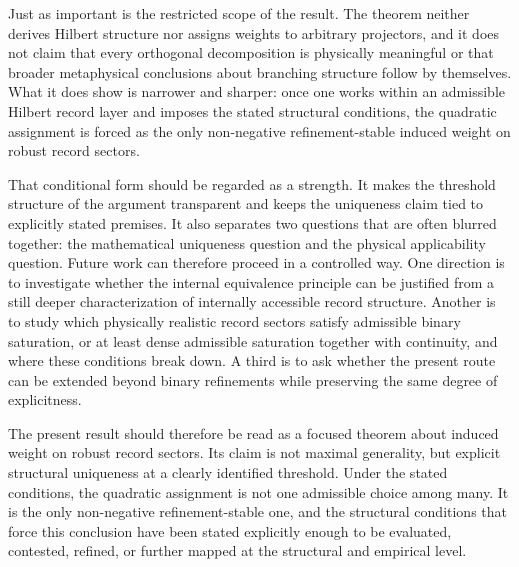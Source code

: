 \documentclass[11pt]{article}
\theoremstyle{remark}
\numberwithin{equation}{section}
\begin{document}
Just as important is the restricted scope of the result. The theorem neither derives Hilbert structure nor assigns weights to arbitrary projectors, and it does not claim that every orthogonal decomposition is physically meaningful or that broader metaphysical conclusions about branching structure follow by themselves. What it does show is narrower and sharper: once one works within an admissible Hilbert record layer and imposes the stated structural conditions, the quadratic assignment is forced as the only non-negative refinement-stable induced weight on robust record sectors.

That conditional form should be regarded as a strength. It makes the
threshold structure of the argument transparent and keeps the
uniqueness claim tied to explicitly stated premises. It also separates
two questions that are often blurred together: the mathematical
uniqueness question and the physical applicability question. Future
work can therefore proceed in a controlled way. One direction is to
investigate whether the internal equivalence principle can be justified
from a still deeper characterization of internally accessible record
structure. Another is to study which physically realistic record
sectors satisfy admissible binary saturation, or at least dense
admissible saturation together with continuity, and where these
conditions break down. A third is to ask whether the present route can
be extended beyond binary refinements while preserving the same degree
of explicitness.

The present result should therefore be read as a focused theorem about
induced weight on robust record sectors. Its claim is not maximal
generality, but explicit structural uniqueness at a clearly identified
threshold.
Under the stated conditions, the quadratic assignment is
not one admissible choice among many. It is the only non-negative
refinement-stable one, and the structural conditions that force this
conclusion have been stated explicitly enough to be evaluated,
contested, refined, or further mapped at the structural and empirical
level.




\end{document}
